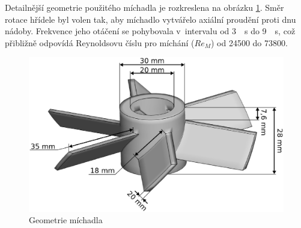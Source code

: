 Detailnější geometrie použitého míchadla je rozkreslena na obrázku \ref{fig:imp}. Směr rotace hřídele byl volen tak, aby míchadlo vytvářelo axiální proudění proti dnu nádoby. Frekvence jeho otáčení se pohybovala v~intervalu od \SI{3}{\per\second} do \SI{9}{\per\second}, což přibližně odpovídá Reynoldsovu číslu pro míchání ($Re_{M}$) od \num{24500} do \num{73800}.
\begin{figure}[t]
\centering
\includegraphics[scale=0.35]{images/imp.eps}
\caption{Geometrie míchadla}
\label{fig:imp}
\end{figure} 

